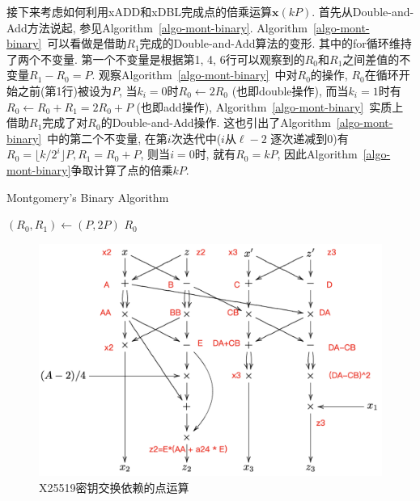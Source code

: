
接下来考虑如何利用\textsf{xADD}和\textsf{xDBL}完成点的倍乘运算$\mathbf{x}(kP)$.
首先从Double-and-Add方法说起, 参见Algorithm~\ref{algo-mont-binary}. 
Algorithm~\ref{algo-mont-binary}~可以看做是借助$R_1$完成的Double-and-Add算法的变形.
其中的\textsf{for}循环维持了两个不变量. 
第一个不变量是根据第1, 4, 6行可以观察到的$R_0$和$R_1$之间差值的不变量$R_1-R_0 = P$.
观察Algorithm~\ref{algo-mont-binary}~中对$R_0$的操作, $R_0$在循环开始之前(第1行)被设为$P$,
当$k_i=0$时$R_0\leftarrow 2R_0$ (也即double操作), 
而当$k_i=1$时有$R_0\leftarrow R_0 + R_1 = 2R_0 + P$ (也即add操作),
Algorithm~\ref{algo-mont-binary}~实质上借助$R_1$完成了对$R_0$的Double-and-Add操作.
这也引出了Algorithm~\ref{algo-mont-binary}~中的第二个不变量, 在第$i$次迭代中($i$从$\ell-2$
逐次递减到0)有$R_0 = \lfloor k/2^i \rfloor P, R_1 = R_0 + P$, 则当$i = 0$时, 就有$R_0 = kP$,
因此Algorithm~\ref{algo-mont-binary}争取计算了点的倍乘$kP$.

\begin{algorithm}[H]
\caption{Montgomery's Binary Algorithm}%
\label{algo-mont-binary}
\LinesNumbered %
$(R_0, R_1)  \leftarrow (P, 2P)$\; %
\Return $R_0$
\end{algorithm}


\begin{figure}[h]
\centering
\includegraphics[width=.8\textwidth]{x-coordiniate-add.png}
\caption{X25519密钥交换依赖的点运算}\label{fig-xadd}
\end{figure}

